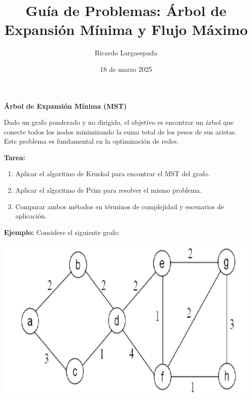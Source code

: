 \documentclass{article}
\title{Guía de Problemas: Árbol de Expansión Mínima y Flujo Máximo}
\author{Ricardo Largaespada}
\date{18 de marzo 2025}
\begin{document}
\maketitle

\begin{problem}
\textbf{Árbol de Expansión Mínima (MST)}

Dado un grafo ponderado y no dirigido, el objetivo es encontrar un árbol que conecte todos los nodos minimizando la suma total de los pesos de sus aristas. Este problema es fundamental en la optimización de redes.

\textbf{Tarea:}
\begin{enumerate}
    \item Aplicar el algoritmo de Kruskal para encontrar el MST del grafo.
    \item Aplicar el algoritmo de Prim para resolver el mismo problema.
    \item Comparar ambos métodos en términos de complejidad y escenarios de aplicación.
\end{enumerate}

\textbf{Ejemplo:} Considere el siguiente grafo:

\begin{center}
    \includegraphics[scale=0.4]{images/trabajo02-1.png}
\end{center}
\end{problem}
\end{document}
